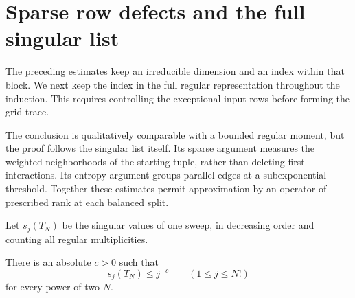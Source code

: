 \section{Sparse row defects and the full singular list}\label{tra:regular-ranks}

The preceding estimates keep an irreducible dimension and an index within that block. We next keep the index in the full regular representation throughout the induction. This requires controlling the exceptional input rows before forming the grid trace.

The conclusion is qualitatively comparable with a
bounded regular moment, but the proof follows the singular list itself.
Its sparse argument measures the weighted neighborhoods of the
starting tuple, rather than deleting first interactions. Its entropy
argument groups parallel edges at a subexponential threshold. Together
these estimates permit approximation by an operator of prescribed
rank at each balanced split.

Let $s_j(T_N)$ be the singular values of one sweep, in decreasing order and counting all regular multiplicities.
\begin{theorem}\label{tra:regular-ranks:main}
There is an absolute $c>0$ such that
\begin{equation}
                             s_j(T_N)\le j^{-c}\qquad (1\le j\le N!)\label{tra:regular-ranks:eq1}
\end{equation}
for every power of two $N$.
\end{theorem}
